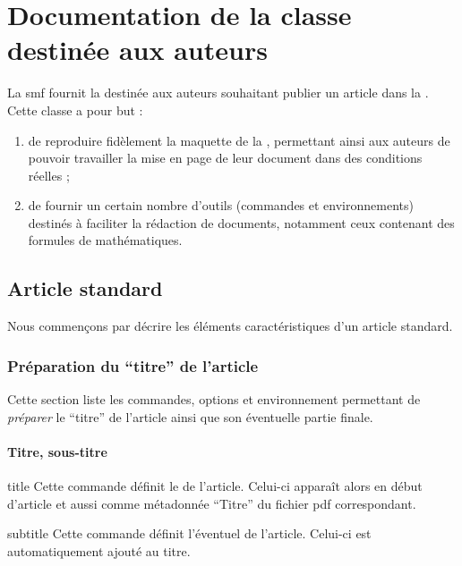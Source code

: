 \chapter{Documentation de la classe destinée aux auteurs}
\label{cha:documentation-auteurs}

La \gls{smf} fournit la \gztauthorcl{} destinée aux auteurs souhaitant publier
un article dans la
\href{http://smf4.emath.fr/Publications/Gazette/}{\gzt*{}}. Cette classe a pour
but :
\begin{enumerate}
\item de reproduire fidèlement la maquette de la \gzt{}, permettant ainsi
  aux auteurs de pouvoir travailler la mise en page de leur document dans des
  conditions réelles ;
\item de fournir un certain nombre d'outils (commandes et environnements)
  destinés à faciliter la rédaction de documents, notamment ceux contenant des
  formules de mathématiques.
\end{enumerate}

\section{Article standard}
\label{sec-article-standard}

Nous commençons par décrire les éléments caractéristiques d'un article standard.

\subsection{Préparation du \enquote{titre} de l'article}
\label{sec-prep-de-lart}

Cette section liste les commandes, options et environnement permettant de
\emph{préparer} le \enquote{titre} de l'article ainsi que son éventuelle partie
finale.

\subsubsection{Titre, sous-titre}
\label{sec-titre}

\begin{docCommand}[doc description=\mandatory]{title}{}
  Cette commande définit le  de l'article. Celui-ci apparaît alors
  en début d'article et aussi comme métadonnée \enquote{Titre} du fichier
  \acrshort{pdf} correspondant.
\end{docCommand}

\begin{docCommand}{subtitle}{}
  Cette commande définit l'éventuel  de l'article. Celui-ci
  est automatiquement ajouté au titre.
\end{docCommand}

